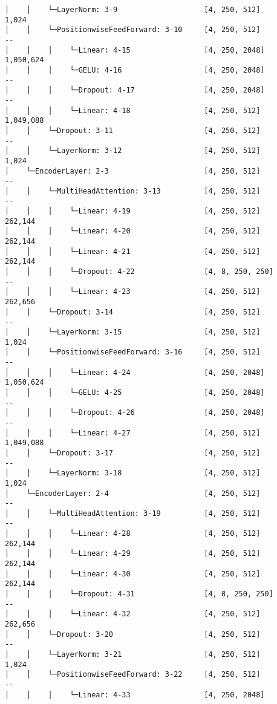 \documentclass[12pt]{article}
\begin{document}
\begin{Verbatim}[commandchars=\\\{\}]
│    │    └─LayerNorm: 3-9                    [4, 250, 512]             1,024
│    │    └─PositionwiseFeedForward: 3-10     [4, 250, 512]             --
│    │    │    └─Linear: 4-15                 [4, 250, 2048]
1,050,624
│    │    │    └─GELU: 4-16                   [4, 250, 2048]            --
│    │    │    └─Dropout: 4-17                [4, 250, 2048]            --
│    │    │    └─Linear: 4-18                 [4, 250, 512]
1,049,088
│    │    └─Dropout: 3-11                     [4, 250, 512]             --
│    │    └─LayerNorm: 3-12                   [4, 250, 512]             1,024
│    └─EncoderLayer: 2-3                      [4, 250, 512]             --
│    │    └─MultiHeadAttention: 3-13          [4, 250, 512]             --
│    │    │    └─Linear: 4-19                 [4, 250, 512]             262,144
│    │    │    └─Linear: 4-20                 [4, 250, 512]             262,144
│    │    │    └─Linear: 4-21                 [4, 250, 512]             262,144
│    │    │    └─Dropout: 4-22                [4, 8, 250, 250]          --
│    │    │    └─Linear: 4-23                 [4, 250, 512]             262,656
│    │    └─Dropout: 3-14                     [4, 250, 512]             --
│    │    └─LayerNorm: 3-15                   [4, 250, 512]             1,024
│    │    └─PositionwiseFeedForward: 3-16     [4, 250, 512]             --
│    │    │    └─Linear: 4-24                 [4, 250, 2048]
1,050,624
│    │    │    └─GELU: 4-25                   [4, 250, 2048]            --
│    │    │    └─Dropout: 4-26                [4, 250, 2048]            --
│    │    │    └─Linear: 4-27                 [4, 250, 512]
1,049,088
│    │    └─Dropout: 3-17                     [4, 250, 512]             --
│    │    └─LayerNorm: 3-18                   [4, 250, 512]             1,024
│    └─EncoderLayer: 2-4                      [4, 250, 512]             --
│    │    └─MultiHeadAttention: 3-19          [4, 250, 512]             --
│    │    │    └─Linear: 4-28                 [4, 250, 512]             262,144
│    │    │    └─Linear: 4-29                 [4, 250, 512]             262,144
│    │    │    └─Linear: 4-30                 [4, 250, 512]             262,144
│    │    │    └─Dropout: 4-31                [4, 8, 250, 250]          --
│    │    │    └─Linear: 4-32                 [4, 250, 512]             262,656
│    │    └─Dropout: 3-20                     [4, 250, 512]             --
│    │    └─LayerNorm: 3-21                   [4, 250, 512]             1,024
│    │    └─PositionwiseFeedForward: 3-22     [4, 250, 512]             --
│    │    │    └─Linear: 4-33                 [4, 250, 2048]

\end{Verbatim}
\end{document}
